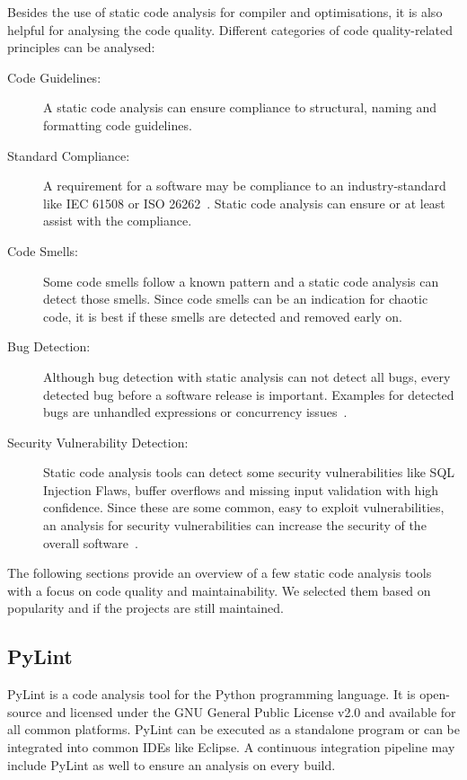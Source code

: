 Besides the use of static code analysis for compiler and optimisations, it is also helpful for analysing the code quality. Different categories of code quality-related principles can be analysed:
\begin{description}
    \item[Code Guidelines:] A static code analysis can ensure compliance to structural, naming and formatting code guidelines. 
    \item[Standard Compliance:] A requirement for a software may be compliance to an industry-standard like IEC 61508 or ISO 26262~\cite{noauthor_iec_2010,isotc_22sc_32_iso_2018}. Static code analysis can ensure or at least assist with the compliance.  
    \item[Code Smells:] Some code smells follow a known pattern and a static code analysis can detect those smells. Since code smells can be an indication for chaotic code, it is best if these smells are detected and removed early on.
    \item[Bug Detection:] Although bug detection with static analysis can not detect all bugs, every detected bug before a software release is important. Examples for detected bugs are unhandled expressions or concurrency issues~\cite{delaitre_evaluating_2015}.
    \item[Security Vulnerability Detection:] Static code analysis tools can detect some security vulnerabilities like SQL Injection Flaws, buffer overflows and missing input validation with high confidence. Since these are some common, easy to exploit vulnerabilities, an analysis for security vulnerabilities can increase the security of the overall software~\cite{wichers_source_nodate}.  
\end{description}

The following sections provide an overview of a few static code analysis tools with a focus on code quality and maintainability. We selected them based on popularity and if the projects are still maintained.

\subsection{PyLint}
PyLint is a code analysis tool for the Python programming language. It is open-source and licensed under the GNU General Public License v2.0 and available for all common platforms. PyLint can be executed as a standalone program or can be integrated into common IDEs like Eclipse. A continuous integration pipeline may include PyLint as well to ensure an analysis on every build.

